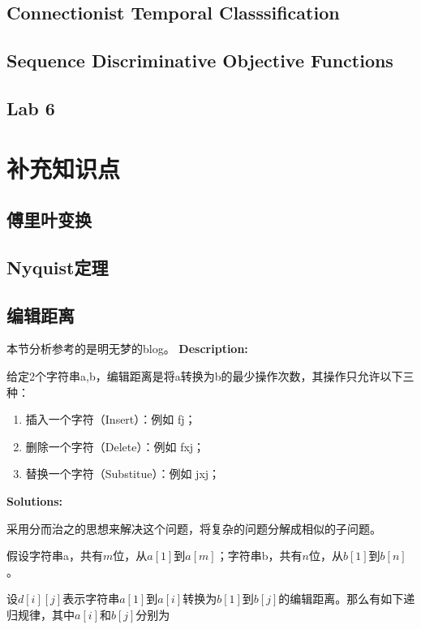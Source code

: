 \subsection{Connectionist Temporal Classsification}

\subsection{Sequence Discriminative Objective Functions}

\subsection{Lab 6}


\section{补充知识点}

\subsection{傅里叶变换}

\subsection{Nyquist定理}

\subsection{编辑距离}
\label{sub:edit-distance}
本节分析参考的是明无梦的blog。
{\bf Description:}

给定2个字符串a,b，编辑距离是将a转换为b的最少操作次数，其操作只允许以下三种：
\begin{enumerate}
  \item 插入一个字符（Insert）：例如 fj；
  \item 删除一个字符（Delete）：例如 fxj；
  \item 替换一个字符（Substitue）：例如 jxj；
\end{enumerate}

{\bf Solutions:}

采用分而治之的思想来解决这个问题，将复杂的问题分解成相似的子问题。

假设字符串a，共有$m$位，从$a[1]$到$a[m]$；字符串b，共有$n$位，从$b[1]$到$b[n]$。

设$d[i][j]$表示字符串$a[1]$到$a[i]$转换为$b[1]$到$b[j]$的编辑距离。那么有如下递归规律，其中$a[i]$和$b[j]$分别为

